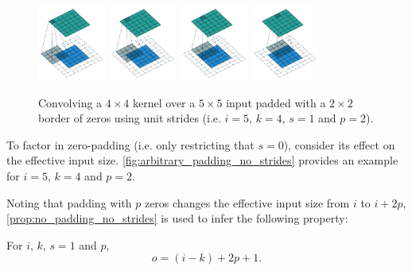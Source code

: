 \documentclass{article}
\begin{document}
\begin{figure}[h]
    \centering
    \includegraphics[width=0.2\textwidth]
        {pdf/arbitrary_padding_no_strides_00.pdf}
    \includegraphics[width=0.2\textwidth]
        {pdf/arbitrary_padding_no_strides_01.pdf}
    \includegraphics[width=0.2\textwidth]
        {pdf/arbitrary_padding_no_strides_02.pdf}
    \includegraphics[width=0.2\textwidth]
        {pdf/arbitrary_padding_no_strides_03.pdf}
    \caption{\label{fig:arbitrary_padding_no_strides} Convolving a $4 \times 4$
        kernel over a $5 \times 5$ input padded with a $2 \times 2$ border of
        zeros using unit strides (i.e. $i = 5$, $k = 4$, $s = 1$ and $p = 2$).}
\end{figure}

To factor in zero-padding (i.e. only restricting that $s = 0$), consider its
effect on the effective input size. \autoref{fig:arbitrary_padding_no_strides}
provides an example for $i = 5$, $k = 4$ and $p = 2$.

Noting that padding with $p$ zeros changes the effective input size from $i$ to
$i + 2p$, \autoref{prop:no_padding_no_strides} is used to infer the following
property:

\begin{prop}\label{prop:arbitrary_padding_no_strides}
For $i$, $k$, $s = 1$ and $p$,
\begin{equation*}
    o = (i - k) + 2p + 1.
\end{equation*}
\end{prop}
\end{document}
